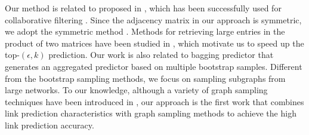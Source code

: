 Our method is related to \NMF proposed in \cite{NMF-nature99}, which
has been successfully used for collaborative
filtering \cite{web}. Since the adjacency matrix in our approach is symmetric, we adopt
the symmetric \NMF method \cite{ding}.  Methods for retrieving large entries in the product of
two matrices have been studied in \cite{ballard2015, lemp}, which motivate us to speed up the
top-$(\epsilon, k)$ prediction. Our work is also related
to bagging predictor \cite{Breiman96b-1996} that generates an aggregated
predictor based on multiple bootstrap samples. Different from the bootstrap
sampling methods, we focus on sampling subgraphs from large networks. To our knowledge, although a
variety of graph sampling techniques have been introduced
in \cite{ahmed2014tkdd,li2015,chierichetti2016}, our approach is the first work that combines link
prediction characteristics \cite{leskovec-2008} with graph sampling
methods to achieve the high link prediction accuracy.







